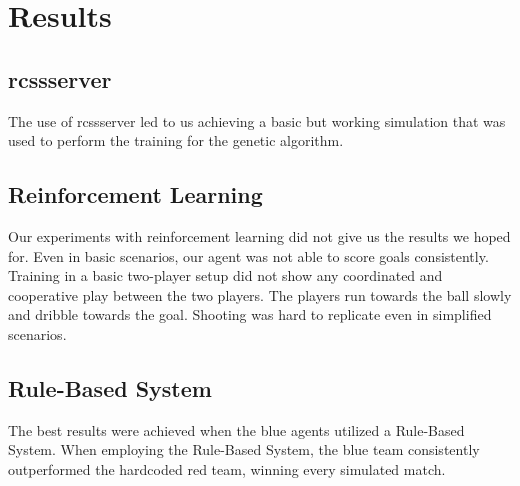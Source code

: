 \section{Results}
\label{section:results}

\subsection{rcssserver}
The use of rcssserver led to us achieving a basic but working simulation that was used to perform the training for the genetic algorithm.

\subsection{Reinforcement Learning}
Our experiments with reinforcement learning did not give us the results we hoped for.  
Even in basic scenarios, our agent was not able to score goals consistently.  
Training in a basic two-player setup did not show any coordinated and cooperative play between the two players.  
The players run towards the ball slowly and dribble towards the goal.  
Shooting was hard to replicate even in simplified scenarios.  

\subsection{Rule-Based System}
The best results were achieved when the blue agents utilized a Rule-Based System. When employing the Rule-Based System, the blue team consistently outperformed the hardcoded red team, winning every simulated match.
